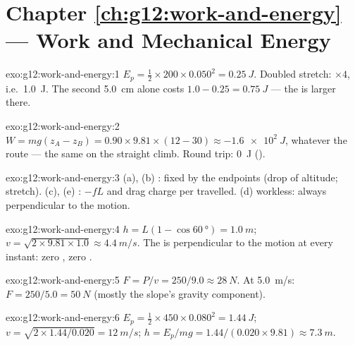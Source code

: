\section*{Chapter \ref{ch:g12:work-and-energy} --- Work and Mechanical Energy}

\begin{solution}{exo:g12:work-and-energy:1}
$E_p = \tfrac12 \times 200 \times 0.050^2 = \qty{0.25}{J}$. Doubled
stretch: $\times 4$, i.e.\ \qty{1.0}{J}. The second \qty{5.0}{cm}
alone costs $1.0 - 0.25 = \qty{0.75}{J}$ --- the  is larger there.
\end{solution}

\begin{solution}{exo:g12:work-and-energy:2}
$W = mg(z_A - z_B) = 0.90 \times 9.81 \times (12 - 30) \approx
\qty{-1.6e2}{J}$, whatever the route --- the same on the straight
climb. Round trip: \qty{0}{J} ().
\end{solution}

\begin{solution}{exo:g12:work-and-energy:3}
(a), (b) :  fixed by the endpoints (drop of altitude;
stretch). (c), (e) : $-fL$ and drag charge per 
travelled. (d) workless: always perpendicular to the motion.
\end{solution}

\begin{solution}{exo:g12:work-and-energy:4}
$h = L(1 - \cos\qty{60}{\degree}) = \qty{1.0}{m}$;
$v = \sqrt{2 \times 9.81 \times 1.0} \approx \qty{4.4}{m/s}$. The
 is perpendicular to the motion at every instant: zero ,
zero .
\end{solution}

\begin{solution}{exo:g12:work-and-energy:5}
$F = P/v = 250/9.0 \approx \qty{28}{N}$. At \qty{5.0}{m/s}:
$F = 250/5.0 = \qty{50}{N}$ (mostly the slope's gravity component).
\end{solution}

\begin{solution}{exo:g12:work-and-energy:6}
$E_p = \tfrac12 \times 450 \times 0.080^2 = \qty{1.44}{J}$;
$v = \sqrt{2 \times 1.44/0.020} = \qty{12}{m/s}$;
$h = E_p/mg = 1.44/(0.020 \times 9.81) \approx \qty{7.3}{m}$.
\end{solution}

